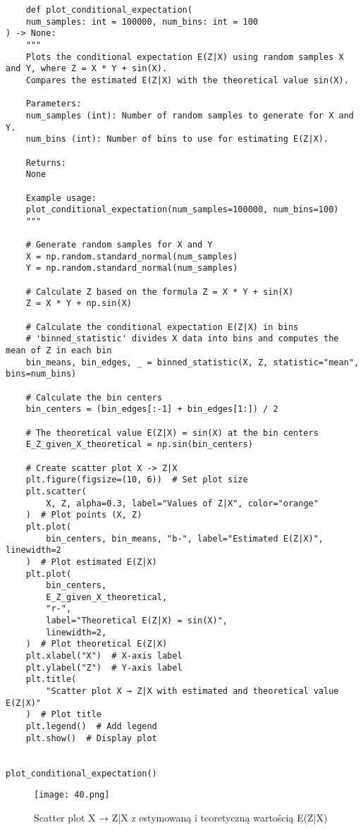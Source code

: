 \documentclass[12pt,letterpaper]{article}
\theoremstyle{definition}
\begin{document}
\begin{lstlisting}
    def plot_conditional_expectation(
    num_samples: int = 100000, num_bins: int = 100
) -> None:
    """
    Plots the conditional expectation E(Z|X) using random samples X and Y, where Z = X * Y + sin(X).
    Compares the estimated E(Z|X) with the theoretical value sin(X).

    Parameters:
    num_samples (int): Number of random samples to generate for X and Y.
    num_bins (int): Number of bins to use for estimating E(Z|X).

    Returns:
    None

    Example usage:
    plot_conditional_expectation(num_samples=100000, num_bins=100)
    """

    # Generate random samples for X and Y
    X = np.random.standard_normal(num_samples)
    Y = np.random.standard_normal(num_samples)

    # Calculate Z based on the formula Z = X * Y + sin(X)
    Z = X * Y + np.sin(X)

    # Calculate the conditional expectation E(Z|X) in bins
    # 'binned_statistic' divides X data into bins and computes the mean of Z in each bin
    bin_means, bin_edges, _ = binned_statistic(X, Z, statistic="mean", bins=num_bins)

    # Calculate the bin centers
    bin_centers = (bin_edges[:-1] + bin_edges[1:]) / 2

    # The theoretical value E(Z|X) = sin(X) at the bin centers
    E_Z_given_X_theoretical = np.sin(bin_centers)

    # Create scatter plot X -> Z|X
    plt.figure(figsize=(10, 6))  # Set plot size
    plt.scatter(
        X, Z, alpha=0.3, label="Values of Z|X", color="orange"
    )  # Plot points (X, Z)
    plt.plot(
        bin_centers, bin_means, "b-", label="Estimated E(Z|X)", linewidth=2
    )  # Plot estimated E(Z|X)
    plt.plot(
        bin_centers,
        E_Z_given_X_theoretical,
        "r-",
        label="Theoretical E(Z|X) = sin(X)",
        linewidth=2,
    )  # Plot theoretical E(Z|X)
    plt.xlabel("X")  # X-axis label
    plt.ylabel("Z")  # Y-axis label
    plt.title(
        "Scatter plot X → Z|X with estimated and theoretical value E(Z|X)"
    )  # Plot title
    plt.legend()  # Add legend
    plt.show()  # Display plot


plot_conditional_expectation()

\end{lstlisting}

\begin{figure}[h!]
    \centering
    \texttt{[image: 40.png]} 


    \caption{Scatter plot X → Z|X z estymowaną i teoretyczną wartością E(Z|X)}

\end{figure}
\end{document}
